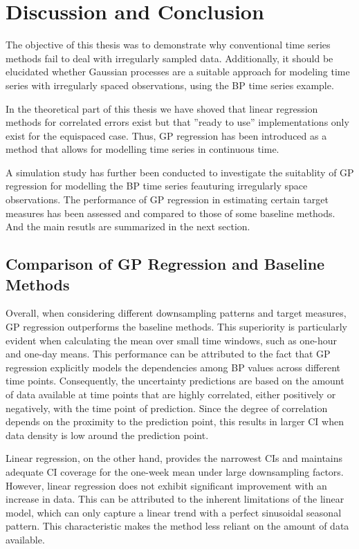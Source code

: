 \chapter{Discussion and Conclusion}\label{ch:discussion-and-conclusion}

The objective of this thesis was to demonstrate why conventional
time series methods fail to deal with irregularly sampled data.
Additionally, it should be elucidated whether Gaussian
processes are a suitable approach for modeling time series with irregularly
spaced observations, using the BP time series example.

In the theoretical part of this thesis we have shoved
that linear regression methods for correlated errors exist but that
”ready to use” implementations only exist for the equispaced
case.
Thus, GP regression has been introduced as a method that allows for
modelling time series in continuous time.

A simulation study has further been conducted to investigate the
suitablity of GP regression for modelling the BP time series feauturing
irregularly space observations.
The performance of GP regression in estimating
certain target measures has been assessed and compared to those of
some baseline methods. And the main resutls are
summarized in the next section.


\section{Comparison of GP Regression and Baseline Methods}

Overall, when considering different downsampling patterns and target measures,
GP regression outperforms the baseline methods. This superiority is particularly
evident when calculating the mean over small time windows, such as one-hour and one-day means.
This performance can be attributed to the fact that GP regression explicitly models
the dependencies among BP values across different time points. Consequently,
the uncertainty predictions are based on the amount of data available at time
points that are highly correlated, either positively or negatively, with the time
point of prediction.
Since the degree of correlation depends on the proximity to the prediction point,
this results in larger CI when data density is low around the prediction point.

Linear regression, on the other hand, provides the narrowest CIs and maintains adequate
CI coverage for the one-week mean under large downsampling factors. However,
linear regression does not exhibit significant improvement with an increase in data.
This can be attributed to the inherent
limitations of the linear model, which can only capture a linear trend with a perfect sinusoidal
seasonal pattern. This characteristic makes the method less reliant on the amount of data available.

